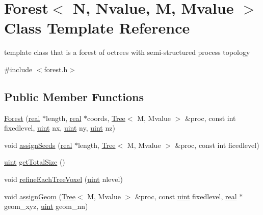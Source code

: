 \hypertarget{classForest}{}\section{Forest$<$ N, Nvalue, M, Mvalue $>$ Class Template Reference}
\label{classForest}


template class that is a forest of octrees with semi-\/structured process topology  




{\ttfamily \#include $<$forest.\+h$>$}

\subsection*{Public Member Functions}
\begin{DoxyCompactItemize}
\item 
\mbox{\hyperlink{classForest_aacc8ee76a6986596ccd704f6aee9832f}{Forest}} (\mbox{\hyperlink{definitions_8h_aedc0ad84d1e764530814f57ad931d02a}{real}} $\ast$length, \mbox{\hyperlink{definitions_8h_aedc0ad84d1e764530814f57ad931d02a}{real}} $\ast$coords, \mbox{\hyperlink{classTree}{Tree}}$<$ M, Mvalue $>$ \&proc, const int fixedlevel, \mbox{\hyperlink{definitions_8h_a69aa29b598b851b0640aa225a9e5d61d}{uint}} nx, \mbox{\hyperlink{definitions_8h_a69aa29b598b851b0640aa225a9e5d61d}{uint}} ny, \mbox{\hyperlink{definitions_8h_a69aa29b598b851b0640aa225a9e5d61d}{uint}} nz)
\item 
void \mbox{\hyperlink{classForest_a70b0db81bf2daade13e4c485e9093df9}{assign\+Seeds}} (\mbox{\hyperlink{definitions_8h_aedc0ad84d1e764530814f57ad931d02a}{real}} $\ast$length, \mbox{\hyperlink{classTree}{Tree}}$<$ M, Mvalue $>$ \&proc, const int ficedlevel)
\item 
\mbox{\hyperlink{definitions_8h_a69aa29b598b851b0640aa225a9e5d61d}{uint}} \mbox{\hyperlink{classForest_ad6c909506408054f02709b88642dc30c}{get\+Total\+Size}} ()
\item 
void \mbox{\hyperlink{classForest_a2c0af912578becb782670ff6cff36a7f}{refine\+Each\+Tree\+Voxel}} (\mbox{\hyperlink{definitions_8h_a69aa29b598b851b0640aa225a9e5d61d}{uint}} nlevel)
\item 
void \mbox{\hyperlink{classForest_a2cfcc87d38a77b1bb310334ffd1afd18}{assign\+Geom}} (\mbox{\hyperlink{classTree}{Tree}}$<$ M, Mvalue $>$ \&proc, const \mbox{\hyperlink{definitions_8h_a69aa29b598b851b0640aa225a9e5d61d}{uint}} fixedlevel, \mbox{\hyperlink{definitions_8h_aedc0ad84d1e764530814f57ad931d02a}{real}} $\ast$geom\+\_\+xyz, \mbox{\hyperlink{definitions_8h_a69aa29b598b851b0640aa225a9e5d61d}{uint}} geom\+\_\+nn)

\end{DoxyCompactItemize}
